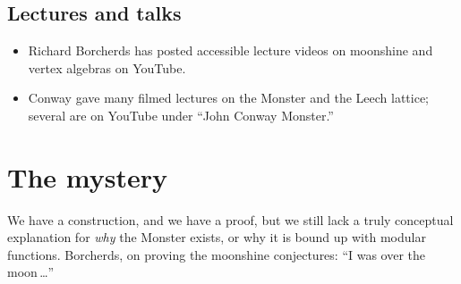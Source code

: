 \documentclass[11pt]{article}
\begin{document}
\subsection*{Lectures and talks}

\begin{itemize}[leftmargin=*, itemsep=2pt]
  \item Richard Borcherds has posted accessible lecture videos on
        moonshine and vertex algebras on YouTube.
  \item Conway gave many filmed lectures on the Monster and the
        Leech lattice; several are on YouTube under
        ``John Conway Monster.''
\end{itemize}

\section*{The mystery}

We have a construction, and we have a proof, but we still lack a
truly conceptual explanation for \emph{why} the Monster exists, or
why it is bound up with modular functions. Borcherds, on proving the
moonshine conjectures: ``I was over the moon\,\ldots''
\end{document}
